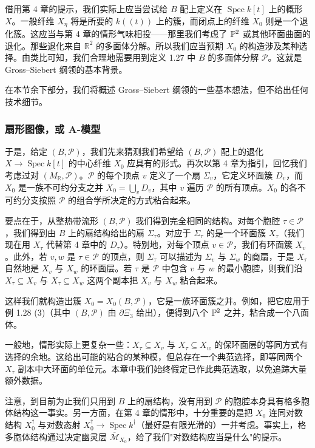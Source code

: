 借用第 4 章的提示，我们实际上应当尝试给 $B$ 配上定义在 $\operatorname{Spec} k[t]$ 上的概形 $X$。一般纤维 $X_{\eta}$ 将是所要的 $k((t))$ 上的簇，而闭点上的纤维 $X_0$ 则是一个退化簇。这应当与第 4 章的情形气味相投——那里我们考虑了 $\mathbb{P}^2$ 或其他环面曲面的退化。那些退化来自 $\mathbb{R}^2$ 的多面体分解。所以我们应当预期 $X_0$ 的构造涉及某种选择。由类比可知，我们合理地需要用到定义 1.27 中 $B$ 的多面体分解 $\mathcal{P}$。这就是 Gross–Siebert 纲领的基本背景。

在本节余下部分，我们将概述 Gross–Siebert 纲领的一些基本想法，但不给出任何技术细节。

\subsubsection{扇形图像，或 A-模型}

于是，给定 $(B,\mathcal{P})$，我们先来猜测我们希望给 $(B,\mathcal{P})$ 配上的退化 $X\to\operatorname{Spec} k[t]$ 的中心纤维 $X_0$ 应具有的形式。再次以第 4 章为指引，回忆我们考虑过对 $(M_{\mathbb{R}},\mathcal{P})$。$\mathcal{P}$ 的每个顶点 $v$ 定义了一个扇 $\Sigma_v$，它定义环面簇 $D_v$，而 $X_0$ 是一族不可约分支之并 $X_0=\bigcup_v D_v$，其中 $v$ 遍历 $\mathcal{P}$ 的所有顶点。$X_0$ 的各不可约分支按照 $\mathcal{P}$ 的组合学所决定的方式粘合起来。

要点在于，从整热带流形 $(B,\mathcal{P})$ 我们得到完全相同的结构。对每个胞腔 $\tau\in\mathcal{P}$，我们得到由 $B$ 上的扇结构给出的扇 $\Sigma_\tau$。对应于 $\Sigma_\tau$ 的是一个环面簇 $X_\tau$（我们现在用 $X_\tau$ 代替第 4 章中的 $D_\tau$）。特别地，对每个顶点 $v\in\mathcal{P}$，我们有环面簇 $X_v$。此外，若 $v,w$ 是 $\tau\in\mathcal{P}$ 的顶点，则 $\Sigma_\tau$ 可以描述为 $\Sigma_v$ 与 $\Sigma_w$ 的商扇，于是 $X_\tau$ 自然地是 $X_v$ 与 $X_w$ 的环面层。若 $\tau$ 是 $\mathcal{P}$ 中包含 $v$ 与 $w$ 的最小胞腔，则我们沿 $X_\tau\subseteq X_v$ 与 $X_\tau\subseteq X_w$ 这两个副本把 $X_v$ 与 $X_w$ 粘合起来。

这样我们就构造出簇 $X_0=X_0(B,\mathcal{P})$，它是一族环面簇之并。例如，把它应用于例 1.28 (3)（其中 $(B,\mathcal{P})$ 由 $\partial\Xi_3$ 给出），便得到八个 $\mathbb{P}^2$ 之并，粘合成一个八面体。

一般地，情形实际上更复杂一些：$X_\tau\subseteq X_v$ 与 $X_\tau\subseteq X_w$ 的保环面层的等同方式有选择的余地。这给出可能的粘合的某种模，但总存在一个典范选择，即等同两个 $X_\tau$ 副本中大环面的单位元。本章中我们始终假定已作此典范选取，以免追踪大量额外数据。

注意，到目前为止我们只用到 $B$ 上的扇结构，没有用到 $\mathcal{P}$ 的胞腔本身具有格多胞体结构这一事实。另一方面，在第 4 章的情形中，十分重要的是把 $X_0$ 连同对数结构 $X_0^{\dagger}$ 与对数态射 $X_0^{\dagger}\to\operatorname{Spec} k^{\dagger}$（最好是有限光滑的）一并考虑。事实上，格多胞体结构通过决定幽灵层 $\overline{\mathcal{M}}_{X_0}$，给了我们"对数结构应当是什么"的提示。

